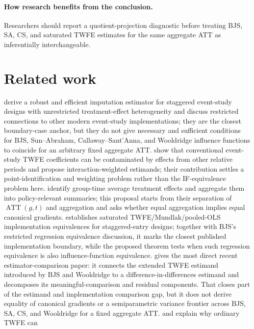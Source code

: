 \documentclass[11pt]{article}
\theoremstyle{definition}
\theoremstyle{plain}
\theoremstyle{remark}
\begin{document}
\paragraph{How research benefits from the conclusion.}
Researchers should report a quotient-projection diagnostic before treating BJS, SA, CS, and saturated
TWFE estimates for the same aggregate ATT as inferentially interchangeable.

\section{Related work}
\citet{BorusyakJaravelSpiess2024} derive a robust and efficient imputation estimator for staggered
event-study designs with unrestricted treatment-effect heterogeneity and discuss restricted
connections to other modern event-study implementations; they are the closest boundary-case anchor,
but they do not give necessary and sufficient conditions for BJS, Sun--Abraham, Callaway--Sant'Anna,
and Wooldridge influence functions to coincide for an arbitrary fixed aggregate ATT.
\citet{SunAbraham2021} show that conventional event-study TWFE coefficients can be contaminated by
effects from other relative periods and propose interaction-weighted estimands; their contribution
settles a point-identification and weighting problem rather than the IF-equivalence problem here.
\citet{CallawaySantAnna2021} identify group-time average treatment effects and aggregate them into
policy-relevant summaries; this proposal starts from their separation of \(\operatorname{ATT}(g,t)\)
and aggregation and asks whether equal aggregation implies equal canonical gradients.
\citet{Wooldridge2021} establishes saturated TWFE/Mundlak/pooled-OLS implementation equivalences for
staggered-entry designs; together with BJS's restricted regression equivalence discussion, it marks
the closest published implementation boundary, while the proposed theorem tests when such regression
equivalence is also influence-function equivalence.
\citet{AguilarLoyo2025} gives the most direct recent estimator-comparison paper: it connects the
extended TWFE estimand introduced by BJS and Wooldridge to a difference-in-differences estimand and
decomposes its meaningful-comparison and residual components.  That closes part of the estimand and
implementation comparison gap, but it does not derive equality of canonical gradients or a
semiparametric variance frontier across BJS, SA, CS, and Wooldridge for a fixed aggregate ATT.
\citet{GoodmanBacon2021} and \citet{deChaisemartinDHaultfoeuille2020} explain why ordinary TWFE can
\end{document}
